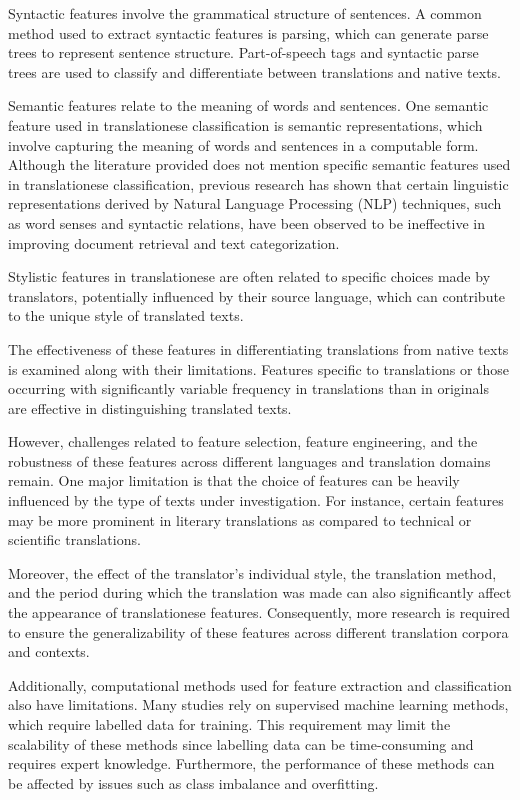 Syntactic features involve the grammatical structure of sentences. A common method used to extract syntactic features is parsing, which can generate parse trees to represent sentence structure. Part-of-speech tags and syntactic parse trees are used to classify and differentiate between translations and native texts.

Semantic features relate to the meaning of words and sentences. One semantic feature used in translationese classification is semantic representations, which involve capturing the meaning of words and sentences in a computable form. Although the literature provided does not mention specific semantic features used in translationese classification, previous research has shown that certain linguistic representations derived by Natural Language Processing (NLP) techniques, such as word senses and syntactic relations, have been observed to be ineffective in improving document retrieval and text categorization.

Stylistic features in translationese are often related to specific choices made by translators, potentially influenced by their source language, which can contribute to the unique style of translated texts.

The effectiveness of these features in differentiating translations from native texts is examined along with their limitations. Features specific to translations or those occurring with significantly variable frequency in translations than in originals are effective in distinguishing translated texts.

However, challenges related to feature selection, feature engineering, and the robustness of these features across different languages and translation domains remain. One major limitation is that the choice of features can be heavily influenced by the type of texts under investigation. For instance, certain features may be more prominent in literary translations as compared to technical or scientific translations.

Moreover, the effect of the translator's individual style, the translation method, and the period during which the translation was made can also significantly affect the appearance of translationese features. Consequently, more research is required to ensure the generalizability of these features across different translation corpora and contexts.

Additionally, computational methods used for feature extraction and classification also have limitations. Many studies rely on supervised machine learning methods, which require labelled data for training. This requirement may limit the scalability of these methods since labelling data can be time-consuming and requires expert knowledge. Furthermore, the performance of these methods can be affected by issues such as class imbalance and overfitting.


